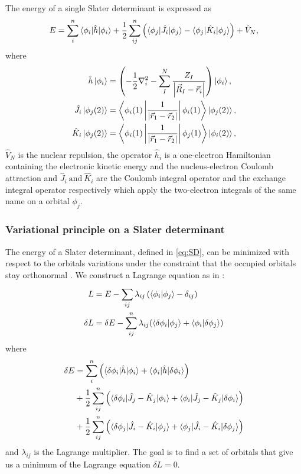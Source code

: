 \documentclass[../master_thesis.tex]{subfiles}
\begin{document}
The energy of a single Slater determinant is expressed as
\begin{equation}
  E = \sumdef[n]{i} \braket{\phi_i|\hat{h}|\phi_i} + \frac{1}{2} \sumdef[n]{ij}\left(\braket{\phi_j|\hat{J}_{i}|\phi_j}
  - \braket{\phi_j|\hat{K}_{i}|\phi_j}\right) + \hat{V}_{N}\text{,}\label{eq:SD}
\end{equation}
where
\begin{align}
\hat{h}\ket{\phi_i} &= \left(-\frac{1}{2}\nabla^2_i - \sumdef[N]{I}\frac{Z_I}{\abs{\Rvec_I - \rvec_i}}\right)\ket{\phi_i},\\
\hat{J}_{i}\ket{\phi_j(2)} &= \left\langle\phi_i(1)\left|\frac{1}{\abs{\rvec_1 - \rvec_2}}\right|\phi_i(1)\right\rangle \ket{\phi_j(2)},\\
\hat{K}_{i}\ket{\phi_j(2)} &= \left\langle\phi_i(1)\left|\frac{1}{\abs{\rvec_1 - \rvec_2}}\right|\phi_j(1)\right\rangle\ket{\phi_i(2)},
\end{align}
$\hat{V}_N$ is the nuclear repulsion, the operator $\hat{h}_i$ is a one-electron Hamiltonian
containing the electronic kinetic energy and the nucleus-electron Coulomb attraction and
$\hat{J}_i\ \text{and}\ \hat{K}_i$ are the Coulomb integral operator and the exchange integral operator
respectively \cite{Jensen:1999, Cramer:2004} which apply the two-electron integrals of the same name on a
orbital $\phi_j$.

\subsubsection{Variational principle on a Slater determinant}

The energy of a Slater determinant, defined in \ref{eq:SD}, can be minimized with
respect to the orbitals  variations under the constraint that the occupied
orbitals stay orthonormal \cite{Jensen:2017}. We
construct a Lagrange equation as in \cite{Jensen:1999}:
\begin{align}
  L &= E - \sumdef{ij}\lambda_{ij}\left(\braket{\phi_i|\phi_j} - \delta_{ij} \right) \\
  \delta L &= \delta E - \sumdef[n]{ij} \lambda_{ij}(\braket{\delta\phi_i|\phi_j} + \braket{\phi_i|\delta\phi_j})\label{eq:dlagrange}
\end{align}
where
\begin{align}\label{eq:dESD}
  \begin{split}
    \delta E &= \sumdef[n]{i}\left(\braket{\delta\phi_i|\hat{h}|\phi_i} + \braket{\phi_i|\hat{h}|\delta\phi_i}\right)\\
    &+ \frac{1}{2}\sumdef[n]{ij}\left(\braket{\delta\phi_i|\hat{J}_j - \hat{K}_j|\phi_i} + \braket{\phi_i|\hat{J}_j - \hat{K}_j|\delta\phi_i}\right)\\
    &+ \frac{1}{2}\sumdef[n]{ij}\left(\braket{\delta\phi_j|\hat{J}_i - \hat{K}_i|\phi_j} + \braket{\phi_j|\hat{J}_i - \hat{K}_i|\delta\phi_j}\right)
  \end{split}
\end{align}
and  $\lambda_{ij}$ is the Lagrange multiplier.
The goal is to find a set of orbitals that give us a minimum of the Lagrange
equation $\delta L = 0$.
\end{document}
